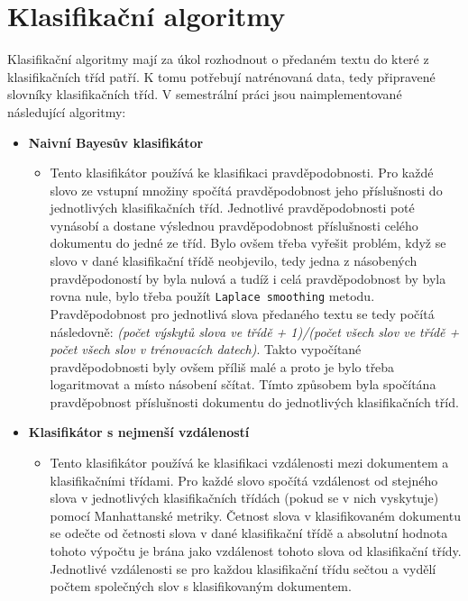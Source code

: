 \documentclass[
12pt,
a4paper,
pdftex,
czech,
titlepage
]{report}
\begin{document}
\section{Klasifikační algoritmy}
Klasifikační algoritmy mají za úkol rozhodnout o předaném textu do které z klasifikačních tříd patří. K tomu potřebují natrénovaná data, tedy připravené slovníky klasifikačních tříd. V semestrální práci jsou naimplementované následující algoritmy:
\begin{itemize}
\item{\textbf{Naivní Bayesův klasifikátor}
\begin{itemize}
\item{Tento klasifikátor používá ke klasifikaci pravděpodobnosti. Pro každé slovo ze vstupní množiny spočítá pravděpodobnost jeho příslušnosti do jednotlivých klasifikačních tříd. Jednotlivé pravděpodobnosti poté vynásobí a dostane výslednou pravděpodobnost příslušnosti celého dokumentu do jedné ze tříd. Bylo ovšem třeba vyřešit problém, když se slovo v dané klasifikační třídě neobjevilo, tedy jedna z násobených pravděpodoností by byla nulová a tudíž i celá pravděpodobnost by byla rovna nule, bylo třeba použít \texttt{Laplace smoothing} metodu. Pravděpodobnost pro jednotlivá slova předaného textu se tedy počítá následovně: \textit{(počet výskytů slova ve třídě + 1)/(počet všech slov ve třídě + počet všech slov v trénovacích datech)}. Takto vypočítané pravděpodobnosti byly ovšem příliš malé a proto je bylo třeba logaritmovat a místo násobení sčítat. Tímto způsobem byla spočítána pravděpobnost příslušnosti dokumentu do jednotlivých klasifikačních tříd.} 
\end{itemize}}
\item{\textbf{Klasifikátor s nejmenší vzdáleností}
\begin{itemize}
\item{Tento klasifikátor používá ke klasifikaci vzdálenosti mezi dokumentem a klasifikačními třídami. Pro každé slovo spočítá vzdálenost od stejného slova v jednotlivých klasifikačních třídách (pokud se v nich vyskytuje) pomocí Manhattanské metriky. Četnost slova v klasifikovaném dokumentu se odečte od četnosti slova v dané klasifikační třídě a absolutní hodnota tohoto výpočtu je brána jako vzdálenost tohoto slova od klasifikační třídy. Jednotlivé vzdálenosti se pro každou klasifikační třídu sečtou a vydělí počtem společných slov s klasifikovaným dokumentem.}
\end{itemize}}
\end{itemize}
\end{document}
